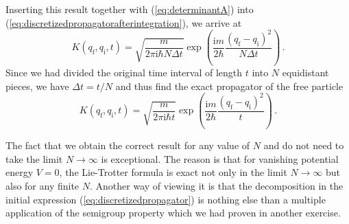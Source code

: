 \documentclass[11pt,DIV=19,parskip=half]{scrartcl}
\begin{document}
Inserting this result together with (\ref{eq:determinantA}) into
(\ref{eq:discretizedpropagatorafterintegration}), we arrive at
\begin{equation}
 K(q_\text{f}, q_\text{i}, t) = \sqrt{\frac{m}{2\pi\text{i}\hbar N\Delta t}}
    \exp\left(\frac{\text{i}m}{2\hbar}\frac{(q_\text{f}-q_\text{i})^2}{N\Delta t}\right)\,.
\end{equation}
Since we had divided the original time interval of length $t$ into $N$ equidistant pieces,
we have $\Delta t=t/N$ and thus find the exact propagator of the free particle
\begin{equation}
 K(q_\text{f}, q_\text{i}, t) = \sqrt{\frac{m}{2\pi\text{i}\hbar t}}
    \exp\left(\frac{\text{i}m}{2\hbar}\frac{(q_\text{f}-q_\text{i})^2}{t}\right)\,.
\end{equation}

The fact that we obtain the correct result for any value of $N$ and do not need to take
the limit $N\to\infty$ is exceptional. The reason is that for vanishing potential energy $V=0$,
the Lie-Trotter formula is exact not only in the limit $N\to\infty$ but also for any finite $N$.
Another way of viewing it is that the decomposition in the initial expression
(\ref{eq:discretizedpropagator}) is nothing else than a multiple application of the 
semigroup property which we had proven in another exercise. 
\end{document}
